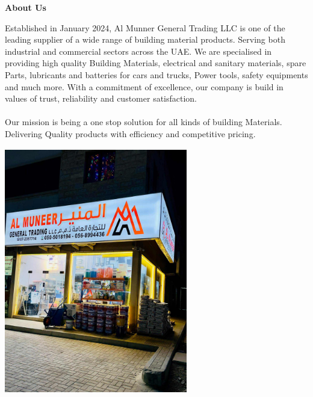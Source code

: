\documentclass[11pt]{article}
\begin{document}
\hfill
\begin{minipage}[t]{0.5\textwidth}
    \vspace{7em}
    \begin{adjustwidth}{2em}{3em} %
    \textbf{\Huge About Us} \\
    \vspace{2em}
    \Large
    
   Established in January 2024, Al Munner General Trading LLC is one of the leading supplier of a wide range of building material products. Serving both industrial and commercial sectors across the UAE. We are specialised in providing high quality Building Materials, electrical and sanitary materials, spare Parts, lubricants and batteries for cars and trucks, Power tools, safety equipments and much more. With a commitment of excellence, our company is build in values of trust, reliability and customer satisfaction.
   \\
   \\
    Our mission is being a one stop solution for all kinds of building Materials.
    Delivering Quality products with efficiency and competitive pricing.
    \end{adjustwidth}
    \vspace{0em}

     \vspace{0pt}
    \begin{center}
    \includegraphics[width=8cm,height=10.8cm,keepaspectratio]{img.jpg}
    \end{center}
\end{minipage}



\noindent
{}
\end{document}
